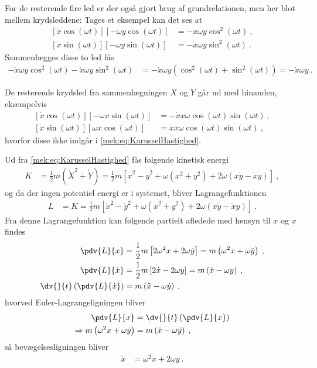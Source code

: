 \noindent
For de resterende fire led er der også gjort brug af grundrelationen, men her blot mellem krydsleddene: Tages et eksempel kan det ses at
%
\begin{align*}
	\left[\dot{x}\cos(\omega t)\right] \left[-\omega y\cos(\omega t)\right] &= -\dot{x}\omega y \cos^2(\omega t) \: , \\
	\left[\dot{x}\sin(\omega t)\right] \left[-\omega y\sin(\omega t)\right] &= -\dot{x}\omega y \sin^2(\omega t) \: .
\end{align*}
%
Sammenlægges disse to led fås
%
\begin{align*}
	-\dot{x}\omega y \cos^2(\omega t) -\dot{x}\omega y \sin^2(\omega t) &= -\dot{x}\omega y \left(\cos^2(\omega t) + \sin^2(\omega t)\right) = -\dot{x}\omega y \: .
\end{align*}

\noindent
De resterende krydsled fra sammenlægningen $\dot{X}$ og $\dot{Y}$ går ud med hinanden, eksempelvis
%
\begin{align*}
	\left[\dot{x}\cos(\omega t)\right] \left[-\omega x \sin(\omega t)\right] &= -\dot{x}x\omega\cos(\omega t)\sin(\omega t) \: , \\
	\left[\dot{x}\sin(\omega t)\right] \left[\omega x \cos(\omega t)\right] &= \dot{x}x\omega\cos(\omega t)\sin(\omega t) \: ,
\end{align*}
%
hvorfor disse ikke indgår i \cref{mek:eq:KarusselHastighed}.

\noindent
Ud fra \cref{mek:eq:KarusselHastighed} fås følgende kinetisk energi
%
\begin{align}
	K &= \frac{1}{2} m \left(\dot{X}^2 + \dot{Y}\right) = \frac{1}{2} m \left[ \dot{x}^2 - \dot{y}^2 + \omega(x^2 + y^2) + 2 \omega (x \dot{y} - \dot{x} y) \right] \: ,
\end{align}
%
og da der ingen potentiel energi er i systemet, bliver Lagrangefunktionen
%
\begin{align}
	L &= K = \frac{1}{2} m \left[ \dot{x}^2 - \dot{y}^2 + \omega(x^2 + y^2) + 2 \omega (x \dot{y} - \dot{x} y) \right] \: .
\end{align}
%
Fra denne Lagrangefunktion kan følgende partielt afledede med hensyn til $x$ og $\dot{x}$ findes
%
\begin{align}
	\pdv{L}{x} &= \frac{1}{2} m \left[ 2\omega^2x + 2\omega \dot{y} \right] = m \left( \omega^2x + \omega \dot{y} \right) \: , \\
	\pdv{L}{\dot{x}} &= \frac{1}{2} m \left[ 2 \dot{x} - 2\omega y \right] = m \left( \dot{x} - \omega y \right) \: , \\
	 \dv{}{t} \left( \pdv{L}{\dot{x}} \right) &= m \left( \ddot{x} - \omega \dot{y} \right) \: ,
\end{align}
%
hvorved Euler-Lagrangeligningen bliver
%
\begin{align}
	\pdv{L}{x} &= \dv{}{t} \left( \pdv{L}{\dot{x}} \right) \nonumber \\
	\Rightarrow m \left( \omega^2 x + \omega \dot{y} \right) &= m \left( \ddot{x} - \omega \dot{y} \right) \: ,
\end{align}
%
så bevægelsesligningen bliver
%
\begin{align} \label{mek:eq:xKarrusel}
	\ddot{x} &= \omega^2x + 2 \omega \dot{y} \: .
\end{align}

